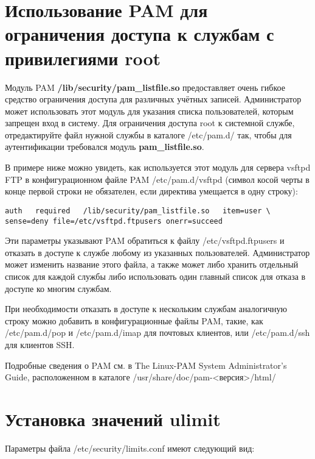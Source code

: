 \documentclass[a4paper,10pt,twoside]{article}
\begin{document}
\section{Использование PAM для ограничения доступа к службам с привилегиями root}
Модуль PAM \textbf{/lib/security/pam\_listfile.so} предоставляет очень гибкое средство ограничения доступа для различных учётных записей. Администратор может использовать этот модуль для указания списка пользователей, которым запрещен вход в систему. Для ограничения доступа root к системной службе, отредактируйте файл нужной службы в каталоге /etc/pam.d/ так, чтобы для аутентификации требовался модуль \textbf{pam\_listfile.so}.

В примере ниже можно увидеть, как используется этот модуль для сервера vsftpd FTP в конфигурационном файле PAM /etc/pam.d/vsftpd (символ косой черты в конце первой строки не обязателен, если директива умещается в одну строку):
\begin{verbatim}
auth   required   /lib/security/pam_listfile.so   item=user \
sense=deny file=/etc/vsftpd.ftpusers onerr=succeed
\end{verbatim} 


Эти параметры указывают PAM обратиться к файлу /etc/vsftpd.ftpusers и отказать в доступе к службе любому из указанных пользователей. Администратор может изменить название этого файла, а также может либо хранить отдельный список для каждой службы либо использовать один главный список для отказа в доступе ко многим службам.

При необходимости отказать в доступе к нескольким службам аналогичную строку можно добавить в конфигурационные файлы PAM, такие, как /etc/pam.d/pop и /etc/pam.d/imap для почтовых клиентов, или /etc/pam.d/ssh для клиентов SSH.


Подробные сведения о PAM см. в The Linux-PAM System Administrator's Guide, расположенном в каталоге /usr/share/doc/pam-<версия>/html/ 



\section{Установка значений ulimit}

Параметры файла /etc/security/limits.conf имеют следующий вид:
\end{document}
